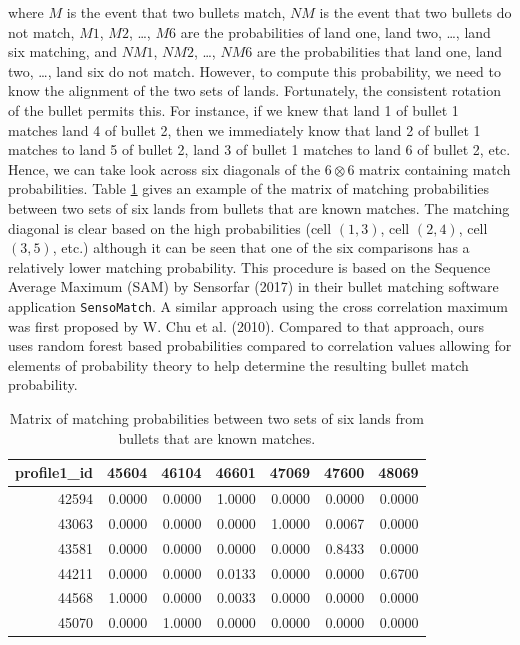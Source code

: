 \documentclass[12pt,]{article}
\theoremstyle{definition}
\theoremstyle{definition}
\theoremstyle{definition}
\theoremstyle{remark}
\begin{document}
where \(M\) is the event that two bullets match, \(NM\) is the event
that two bullets do not match, \(M1\), \(M2\), \ldots{}, \(M6\) are the
probabilities of land one, land two, \ldots{}, land six matching, and
\(NM1\), \(NM2\), \ldots{}, \(NM6\) are the probabilities that land one,
land two, \ldots{}, land six do not match. However, to compute this
probability, we need to know the alignment of the two sets of lands.
Fortunately, the consistent rotation of the bullet permits this. For
instance, if we knew that land 1 of bullet 1 matches land 4 of bullet 2,
then we immediately know that land 2 of bullet 1 matches to land 5 of
bullet 2, land 3 of bullet 1 matches to land 6 of bullet 2, etc. Hence,
we can take look across six diagonals of the \(6 \otimes 6\) matrix
containing match probabilities. Table \ref{tab:diag} gives an example of
the matrix of matching probabilities between two sets of six lands from
bullets that are known matches. The matching diagonal is clear based on
the high probabilities (cell \((1, 3)\), cell \((2, 4)\), cell
\((3, 5)\), etc.) although it can be seen that one of the six
comparisons has a relatively lower matching probability. This procedure
is based on the Sequence Average Maximum (SAM) by Sensorfar (2017) in
their bullet matching software application \texttt{SensoMatch}. A
similar approach using the cross correlation maximum was first proposed
by W. Chu et al. (2010). Compared to that approach, ours uses random
forest based probabilities compared to correlation values allowing for
elements of probability theory to help determine the resulting bullet
match probability.

\begin{table}[ht]
\centering
\begin{tabular}{rrrrrrr}
  \hline
profile1\_id & 45604 & 46104 & 46601 & 47069 & 47600 & 48069 \\ 
  \hline
42594 & 0.0000 & 0.0000 & 1.0000 & 0.0000 & 0.0000 & 0.0000 \\ 
  43063 & 0.0000 & 0.0000 & 0.0000 & 1.0000 & 0.0067 & 0.0000 \\ 
  43581 & 0.0000 & 0.0000 & 0.0000 & 0.0000 & 0.8433 & 0.0000 \\ 
  44211 & 0.0000 & 0.0000 & 0.0133 & 0.0000 & 0.0000 & 0.6700 \\ 
  44568 & 1.0000 & 0.0000 & 0.0033 & 0.0000 & 0.0000 & 0.0000 \\ 
  45070 & 0.0000 & 1.0000 & 0.0000 & 0.0000 & 0.0000 & 0.0000 \\ 
   \hline
\end{tabular}
\caption{Matrix of matching probabilities between two sets of six lands from bullets that are known matches.} 
\label{tab:diag}
\end{table}
\end{document}
